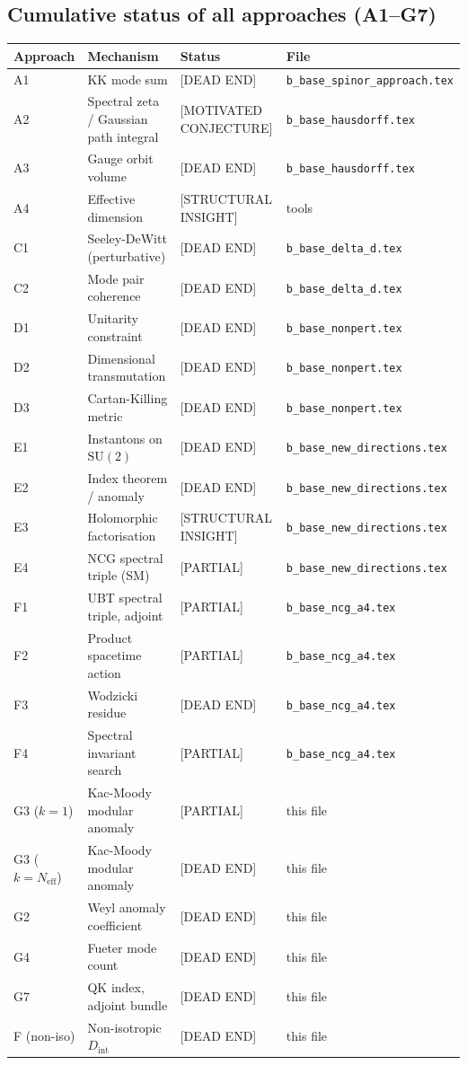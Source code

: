 \documentclass[11pt,a4paper]{article}
\theoremstyle{definition}
\theoremstyle{remark}
\begin{document}
\subsection{Cumulative status of all approaches (A1--G7)}

\begin{center}
\begin{tabular}{llll}
  \toprule
  Approach & Mechanism & Status & File \\
  \midrule
  A1 & KK mode sum & [DEAD END] & \texttt{b\_base\_spinor\_approach.tex} \\
  A2 & Spectral zeta / Gaussian path integral & [MOTIVATED CONJECTURE] & \texttt{b\_base\_hausdorff.tex} \\
  A3 & Gauge orbit volume & [DEAD END] & \texttt{b\_base\_hausdorff.tex} \\
  A4 & Effective dimension & [STRUCTURAL INSIGHT] & tools \\
  C1 & Seeley-DeWitt (perturbative) & [DEAD END] & \texttt{b\_base\_delta\_d.tex} \\
  C2 & Mode pair coherence & [DEAD END] & \texttt{b\_base\_delta\_d.tex} \\
  D1 & Unitarity constraint & [DEAD END] & \texttt{b\_base\_nonpert.tex} \\
  D2 & Dimensional transmutation & [DEAD END] & \texttt{b\_base\_nonpert.tex} \\
  D3 & Cartan-Killing metric & [DEAD END] & \texttt{b\_base\_nonpert.tex} \\
  E1 & Instantons on $\mathrm{SU}(2)$ & [DEAD END] & \texttt{b\_base\_new\_directions.tex} \\
  E2 & Index theorem / anomaly & [DEAD END] & \texttt{b\_base\_new\_directions.tex} \\
  E3 & Holomorphic factorisation & [STRUCTURAL INSIGHT] & \texttt{b\_base\_new\_directions.tex} \\
  E4 & NCG spectral triple (SM) & [PARTIAL] & \texttt{b\_base\_new\_directions.tex} \\
  F1 & UBT spectral triple, adjoint & [PARTIAL] & \texttt{b\_base\_ncg\_a4.tex} \\
  F2 & Product spacetime action & [PARTIAL] & \texttt{b\_base\_ncg\_a4.tex} \\
  F3 & Wodzicki residue & [DEAD END] & \texttt{b\_base\_ncg\_a4.tex} \\
  F4 & Spectral invariant search & [PARTIAL] & \texttt{b\_base\_ncg\_a4.tex} \\
  G3 ($k=1$) & Kac-Moody modular anomaly & [PARTIAL] & this file \\
  G3 ($k=N_{\mathrm{eff}}$) & Kac-Moody modular anomaly & [DEAD END] & this file \\
  G2 & Weyl anomaly coefficient & [DEAD END] & this file \\
  G4 & Fueter mode count & [DEAD END] & this file \\
  G7 & QK index, adjoint bundle & [DEAD END] & this file \\
  F (non-iso) & Non-isotropic $D_{\mathrm{int}}$ & [DEAD END] & this file \\
  \bottomrule
\end{tabular}
\end{center}
\end{document}
